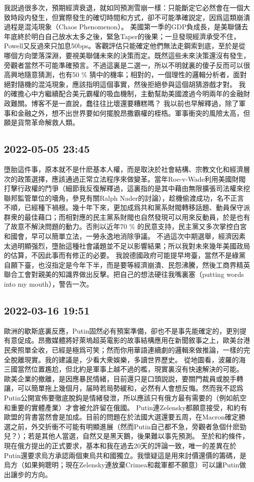 \documentclass[twocolumn]{ctexart}
\begin{document}
我説過很多次，預期經濟衰退，就如同預測雪崩一樣：只能斷定它必然會在一個大致時段内發生，但實際發生的確切時間和方式，卻不可能準確説定，因爲這類崩潰過程是混沌現象（Chaos Phenomenon）。
美國第一季的GDP負成長，是美聯儲去年底終於明白自己放水太多之後，緊急Taper的後果；一旦發現經濟承受不住，Powell又反過來只加息50bps。客觀評估只能確定他們無法走鋼索到底，至於是從哪個方向墜落深淵，要視美聯儲未來的決策而定。既然這些未來決策還沒有發生，旁觀者當然不可能準確預言。不過這裏是二選一，所以不明就裏的傻子反而可以很高興地隨意猜測，也有50 \% 猜中的機率；相對的，一個理性的邏輯分析者，面對絕對隨機的混沌現象，應該指明這個事實，然後拒絕參與這個胡猜游戲才對。
我的確擔心中方繼續配合美元霸權的吸血機制，主動幫助美國渡過今明兩年的金融財政難關。博客不是一直說，蠢往往比壞還要糟糕嗎？
我以前也早解釋過，除了軍事和金融之外，想不出世界要如何擺脫昂撒霸權的桎梏。軍事衝突的風險太高，但願是貨幣革命解救人類。
\subsection*{2022-05-05 23:45}

墮胎這件事，原本就不是什麽基本人權，而是取決於社會結構、宗教文化和經濟層次的政策選擇，應該通過正常立法程序來做變革。當年Roe-v-Wade利用美國財閥打擊行政權的鬥爭（細節我反復解釋過，這裏指的是其中藉由無限擴張司法權來挖聯邦監管單位的墻角，參見有關Ralph Nader的討論），趁機偷渡成功，名不正言不順，已經種下禍根。幾十年下來，更加成爲共和黨系財閥轉移話題、動員保守派群衆的最佳藉口；而相對應的民主黨系財閥也自然發現可以用來反動員，於是也有了故意不解決問題的動力。否則以近年70 \% 的民意支持，民主黨又多次掌控白宮和國會，早可以簡單立法，一勞永逸地消除爭議。
不過這次中期選舉，經濟因素太過明顯强烈，墮胎這種社會議題並不足以影響結果；所以我對未來幾年美國政局的估算，不因此事而有修正的必要。
我說德國政府可能提早垮臺，當然不是綠黨自願下臺，也沒指定是今年下半，而是要等經濟崩潰、民怨沸騰，然後工商界精英聯合工會對親美的知識界做出反擊。把自己的想法硬往我嘴裏塞（putting words into my mouth），警告一次。
\subsection*{2022-03-16 19:51}

歐洲的歇斯底裏反應，Putin固然必有預案準備，卻也不是事先能確定的，更別提有意促成。昂撒媒體將好萊塢超英電影的故事結構應用在新聞敘事之上，歐美台港民衆照單全收，已經是極爲可笑；然而你用華語連續劇的邏輯來做推論，一樣的完全脫離現實。我的建議是，少看大衆娛樂，多讀世界歷史。
從地圖看，波羅的海三國當然位置尷尬，但北約是軍事上越不過的檻，現實裏沒有快速解決的可能。
歐美企業的撤離，是因應暴民情緒，目前還只是口頭説説，要關門裁員或脫手轉讓，可以簡單拖上幾個月，届時若局勢緩和，必然有人會想反悔。然而我不認爲Putin公開宣佈要徹底脫鈎是情緒發泄，所以應該只有俄方最有需要的（例如航空和重要的實體產業）才會被允許留在俄國。
Putin連Zelensky都願意接受，和約有歐盟的背書當然會是加成。目前的問題在於法國大選還要五周，在Macron確定勝選之前，外交折衝不可能有明顯進展（然而Putin自己都不急，旁觀者急個什麽勁兒？）；若是其他人當選，自然又是黑天鵝，後果難以事先預測。
至於和約條件，現在俄方提出的正式要求，基本和我在過去20天的評論一致，唯一的差異在於Putin還要求烏方承認兩個東烏共和國獨立。我懷疑這是用來討價還價的籌碼，是烏方（如果夠聰明；現在Zelensky連放棄Crimea和裁軍都不願意）可以讓Putin做出讓步的方向。
\end{document}
